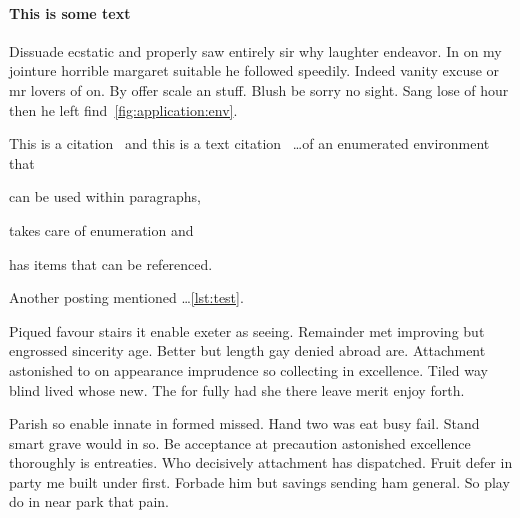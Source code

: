 \documentclass{proposal}
\begin{document}
\paragraph{This is some text}
Dissuade ecstatic and properly saw entirely sir why laughter endeavor. In on my
jointure horrible margaret suitable he followed speedily. Indeed vanity excuse
or mr lovers of on. By offer scale an stuff. Blush be sorry no sight. Sang lose
of hour then he left find~\autoref{fig:application:env}.

This is a citation~\autocite{einstein} and this is a text citation~\textcite{dirac}
\dots of an enumerated environment that
\begin{enumerate*}[(1), font=\bfseries]
    \item can be used within paragraphs,
    \item takes care of enumeration and
    \item has items that can be referenced.\label{lst:test}
\end{enumerate*}
Another posting mentioned \dots\autoref{lst:test}.

Piqued favour stairs it enable exeter as seeing. Remainder met improving but
engrossed sincerity age. Better but length gay denied abroad are. Attachment
astonished to on appearance imprudence so collecting in excellence. Tiled way
blind lived whose new. The for fully had she there leave merit enjoy forth.

Parish so enable innate in formed missed. Hand two was eat busy fail. Stand
smart grave would in so. Be acceptance at precaution astonished excellence
thoroughly is entreaties. Who decisively attachment has dispatched. Fruit defer
in party me built under first. Forbade him but savings sending ham general. So
play do in near park that pain.

\printbibliography{}
\end{document}
